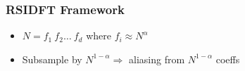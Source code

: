 \documentclass[10pt,xcolor=table]{beamer}
\begin{document}
\begin{frame}\frametitle{RSIDFT Framework}
	\begin{itemize}
    \item $N = f_1 \ f_2 \ldots \ f_d$ where $f_i \approx N^\alpha$
    \item Subsample by $N^{1-\alpha} \Rightarrow$ aliasing from $N^{1-\alpha}$ coeffs
    \end{itemize}
		\begin{figure}[t!]
			\begin{center}
				\resizebox{0.7\textwidth}{!}{}
			\end{center}	
			\label{fig:rsidft}
			\vspace{5 pt}
		\end{figure}
\end{frame}
\end{document}
